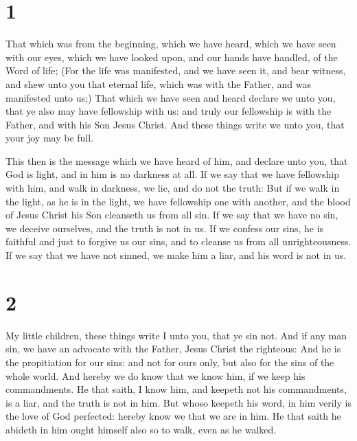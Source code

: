 \hypertarget{section}{%
\section{1}\label{section}}

 That which was from the beginning, which we have heard,
which we have seen with our eyes, which we have looked upon, and our
hands have handled, of the Word of life;  (For the life was
manifested, and we have seen it, and bear witness, and shew unto you
that eternal life, which was with the Father, and was manifested unto
us;)  That which we have seen and heard declare we unto you,
that ye also may have fellowship with us: and truly our fellowship is
with the Father, and with his Son Jesus Christ.  And these
things write we unto you, that your joy may be full.

 This then is the message which we have heard of him, and
declare unto you, that God is light, and in him is no darkness at all.
 If we say that we have fellowship with him, and walk in
darkness, we lie, and do not the truth:  But if we walk in
the light, as he is in the light, we have fellowship one with another,
and the blood of Jesus Christ his Son cleanseth us from all sin.
 If we say that we have no sin, we deceive ourselves, and
the truth is not in us.  If we confess our sins, he is
faithful and just to forgive us our sins, and to cleanse us from all
unrighteousness.  If we say that we have not sinned, we
make him a liar, and his word is not in us.

\hypertarget{section-1}{%
\section{2}\label{section-1}}

 My little children, these things write I unto you, that ye
sin not. And if any man sin, we have an advocate with the Father, Jesus
Christ the righteous:  And he is the propitiation for our
sins: and not for ours only, but also for the sins of the whole world.
 And hereby we do know that we know him, if we keep his
commandments.  He that saith, I know him, and keepeth not
his commandments, is a liar, and the truth is not in him. 
But whoso keepeth his word, in him verily is the love of God perfected:
hereby know we that we are in him.  He that saith he abideth
in him ought himself also so to walk, even as he walked.


